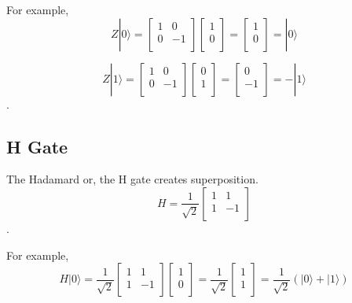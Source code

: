 For example,
\begin{equation}
 Z|0\rangle = \begin{bmatrix}
1 & 0 \\
0 & -1 \\
\end{bmatrix} 
\left[
\begin{array}{c}
1 \\
0 \\
\end{array}
\right]
= \left[
\begin{array}{c}
1 \\
0 \\
\end{array}
\right]
= |0\rangle
\end{equation}

\begin{equation}
Z|1\rangle = \begin{bmatrix}
1 & 0 \\
0 & -1 \\
\end{bmatrix} 
\left[
\begin{array}{c}
0 \\
1  \\
\end{array}
\right]
= \left[
\begin{array}{c}
0 \\
-1 \\
\end{array}
\right]
= -|1\rangle
\end{equation}.

\subsection{H Gate}
The Hadamard or, the H gate creates superposition.
\begin{equation}
 H = \frac{1}{\sqrt{2}}\begin{bmatrix}
1 & 1\\
1 & -1 \\
\end{bmatrix}
\end{equation}.

For example,
\begin{equation}
H|0\rangle = \frac{1}{\sqrt{2}}\begin{bmatrix}
1 & 1\\
1 & -1 \\
\end{bmatrix}\left[
\begin{array}{c}
1 \\
0 \\
\end{array}
\right]
= \frac{1}{\sqrt{2}} \left[
\begin{array}{c}
1 \\
1 \\
\end{array}
\right]
= \frac{1}{\sqrt{2}} (|0\rangle + |1\rangle)
\end{equation}

